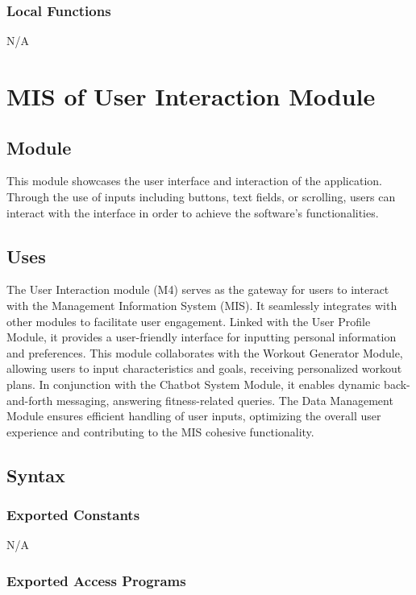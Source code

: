 \documentclass[12pt, titlepage]{article}
\begin{document}
\subsubsection{Local Functions}
N/A

\section{MIS of User Interaction Module}


\subsection{Module}
This module showcases the user interface and interaction of the application. Through the use of inputs including buttons, text fields, or scrolling, users can interact with the interface in order to achieve the software's functionalities. 

\subsection{Uses}
The User Interaction module (M4) serves as the gateway for users to interact with the Management Information System (MIS). It seamlessly integrates with other modules to facilitate user engagement. Linked with the User Profile Module, it provides a user-friendly interface for inputting personal information and preferences. This module collaborates with the Workout Generator Module, allowing users to input characteristics and goals, receiving personalized workout plans. In conjunction with the Chatbot System Module, it enables dynamic back-and-forth messaging, answering fitness-related queries. The Data Management Module ensures efficient handling of user inputs, optimizing the overall user experience and contributing to the MIS cohesive functionality.

\subsection{Syntax}

\subsubsection{Exported Constants}
N/A

\subsubsection{Exported Access Programs}
\end{document}
